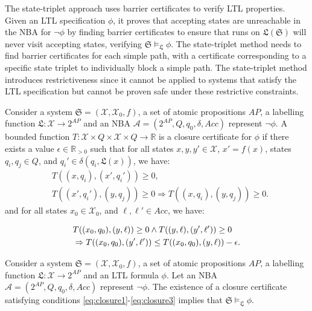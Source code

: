 The state-triplet approach\cite{wongpiromsarn2015automata} uses barrier certificates to verify LTL properties. Given an LTL specification $\phi$, it proves that accepting states are unreachable in the NBA for $\neg\phi$ by finding barrier certificates to ensure that runs on $\mathfrak{L}(\mathfrak{S})$ will never visit accepting states, verifying $\mathfrak{S} \models_{\mathfrak{L}} \phi$. The state-triplet method needs to find barrier certificates for each simple path, with a certificate corresponding to a specific state triplet to individually block a simple path. The state-triplet method introduces restrictiveness since it cannot be applied to systems that satisfy the LTL specification but cannot be proven safe under these restrictive constraints.


\begin{definition}
\label{LTLCC}
Consider a system $\mathfrak{S} = (\mathcal{X}, \mathcal{X}_0, f)$, a set of atomic propositions $AP$, a labelling function $\mathfrak{L} : \mathcal{X} \rightarrow 2^{AP}$ and an NBA $\mathcal{A} = (2^{AP}, Q, q_0, \delta, Acc)$ represent $\neg \phi$. A bounded function $T : \mathcal{X} \times Q \times \mathcal{X} \times Q \rightarrow \mathbb{R}$ is a closure certificate for $\phi$ if there exists a value $\epsilon \in \mathbb{R}_{> 0}$ such that for all states $x, y, y' \in \mathcal{X}$, $x' = f(x)$, states $q_i, q_j \in Q$, and $q_i' \in \delta(q_i, \mathfrak{L}(x))$, we have:
\begin{align}
    &T((x, q_i), (x', q_i')) \geq 0, \label{eq:closure1} \\
    &T((x', q_i'), (y, q_j)) \geq 0 \Rightarrow T((x, q_i), (y, q_j)) \geq 0. \label{eq:closure2}
\end{align}
and for all states $x_0 \in \mathcal{X}_0$, and $\ell, \ell' \in Acc$, we have:

\begin{align}
  & T((x_0, q_0), (y, \ell)) \geq 0 \land T((y, \ell), (y', \ell')) \geq 0 \notag \\
  &\Rightarrow T((x_0, q_0), (y', \ell')) \leq T((x_0, q_0), (y, \ell)) - \epsilon. \label{eq:closure3}
\end{align}
\end{definition}

\begin{theorem}
Consider a system $\mathfrak{S}=(\mathcal{X}, \mathcal{X}_0, f)$, a set of atomic propositions $AP$, a labelling function $\mathfrak{L}: \mathcal{X} \rightarrow 2^{AP}$ and an LTL formula $\phi$. Let an NBA $\mathcal{A} = (2^{AP}, Q, q_0, \delta, Acc)$ represent $\neg \phi$. The existence of a closure certificate satisfying conditions \eqref{eq:closure1}-\eqref{eq:closure3} implies that $\mathfrak{S} \models_\mathfrak{L} \phi$.
\end{theorem}

